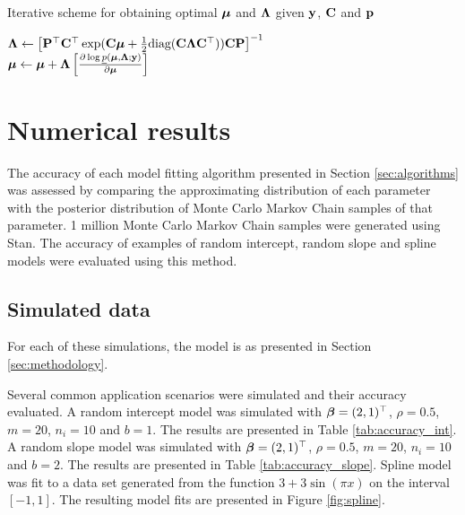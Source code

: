 \documentclass{article}[12pt]
\begin{document}
	\begin{algorithm}
		\caption[Algorithm GVA NR]{Iterative scheme for obtaining optimal ${\boldsymbol \mu}$ and ${\boldsymbol \Lambda}$
			given ${\bf y}$, ${\bf C}$ and ${\bf p}$}
		\label{alg:algorithm_nr}
		\begin{algorithmic}
			\STATE ${\boldsymbol \Lambda} \leftarrow \left [ {\bf P}^\top {\bf C}^\top \exp({\bf C} {\boldsymbol \mu} + \tfrac{1}{2} \text{diag}({\bf C} {\boldsymbol \Lambda} {\bf C}^\top)) {\bf C} {\bf P} \right ]^{-1}$ \\ [1ex]
			\STATE ${\boldsymbol \mu} \leftarrow {\boldsymbol\mu} + {\boldsymbol \Lambda} \left [ \frac{\partial \log \underline{p}({\boldsymbol \mu}, {\boldsymbol \Lambda}; {\bf y})}{\partial {\boldsymbol\mu}} \right ]$
			\ENDWHILE
		\end{algorithmic}
	\end{algorithm}
	
	
	\section{Numerical results}
	\label{sec:results}
	
	The accuracy of each model fitting algorithm presented in Section \ref{sec:algorithms} was assessed by
	comparing the approximating distribution of each parameter with the posterior distribution of Monte Carlo
	Markov Chain samples of that parameter. 1 million Monte Carlo Markov Chain samples were generated using Stan.
	The accuracy of examples of random intercept, random slope and spline models were evaluated using this method.
	
	\subsection{Simulated data}
	
	For each of these simulations, the model is as presented in Section \ref{sec:methodology}.
	
	Several common application scenarios were simulated and their accuracy evaluated. A random intercept model was
	simulated with ${\boldsymbol \beta} = (2, 1)^\top$, $\rho = 0.5$, $m = 20$, $n_i = 10$ and $b = 1$. The results are
	presented in Table \ref{tab:accuracy_int}. A random slope model was simulated with ${\boldsymbol \beta} = (2, 1)^\top$,
	$\rho = 0.5$, $m = 20$, $n_i = 10$ and $b = 2$. The results are presented in Table \ref{tab:accuracy_slope}.
	Spline model was fit to a data set generated from the function $3 + 3 \sin{(\pi x)}$ on the interval $[-1,
	1]$. The resulting model fits are presented in Figure \ref{fig:spline}.
	
\end{document}
